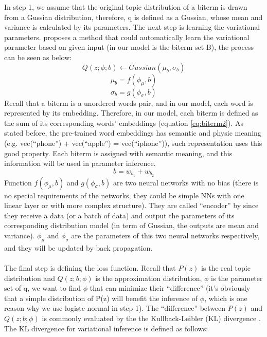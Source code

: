 In step 1, we assume that the original topic distribution of a biterm is drawn from a Gussian distribution, therefore, q is defined as a Gussian, whose mean and variance is calculated by its parameters. The next step is learning the variational parameters. \cite{kingma2013auto} proposes a method that could automatically learn the variational parameter based on given input (in our model is the biterm set B), the process can be seen as below:
\begin{equation}
    Q(z;\phi;b) \leftarrow Gussian(\mu_b,\sigma_b)
\label{eq:var1}
\end{equation}
\begin{equation}
    \mu_b = f(\phi_{\mu}, b)
\label{eq:var2}
\end{equation}
\begin{equation}
    \sigma_b = g(\phi_{\sigma}, b)
\label{eq:var3}
\end{equation}
Recall that a biterm is a unordered words pair, and in our model, each word is represented by its embedding. Therefore, in our model, each biterm is defined as the sum of its corresponding words' embeddings (equation \ref{eq:biterm2}). As stated before, the pre-trained word embeddings has semantic and physic meaning (e.g. vec(``phone'') + vec(``apple'') = vec(``iphone'')), such representation uses this good property. Each biterm is assigned with semantic meaning, and this information will be used in parameter inference.
\begin{equation}
    b = w_{b_1} + w_{b_2}
\label{eq:biterm2}
\end{equation}
Function $f(\phi_{\mu}, b)$ and $g(\phi_{\sigma}, b)$ are two neural networks with no bias (there is no special requirements of the networks, they could be simple NNs with one linear layer or with more complex structure). They are called ``encoder'' by \cite{kingma2013auto} since they receive a data (or a batch of data) and output the parameters of its corresponding distribution model (in term of Gussian, the outputs are mean and variance). $\phi_{\mu}$ and $\phi_{\sigma}$ are the parameters of this two neural networks respectively, and they will be updated by back propagation.\\\\
The final step is defining the loss function. Recall that $P(z)$ is the real topic distribution and $Q(z;b;\phi)$ is the approximation distribution, $\phi$ is the parameter set of q, we want to find $\phi$ that can minimize their ``difference'' (it's obviously that a simple distribution of P(z) will benefit the inference of $\phi$, which is one reason why we use logistc normal in step 1). The ``difference'' between $P(z)$ and $Q(z;b;\phi)$ is commonly evaluated by the  the Kullback-Leibler (KL) divergence \cite{yang2017understanding}. The KL divergence for variational inference is defined as follows: 
